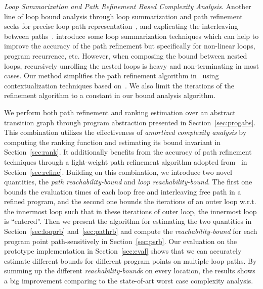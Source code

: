 \emph{Loop Summarization and Path Refinement Based Complexity Analysis}.
Another line of loop bound analysis through loop summarization and path refinement seeks for precise loop path representation~\cite{ManoliosV06,BalakrishnanSIG09,SharmaDDA11,Flores-MontoyaH14,HumenbergerJK18,CyphertBKR19}, and explicating the interleaving between paths~\cite{GulwaniJK09,ZulegerGSV11}.
\cite{KincaidBCR19,KincaidCBR18,BreckCKR20} introduce some loop summarization techniques which can help to improve the accuracy of the path refinement but specifically for non-linear loops, program recurrence, etc.
However, when composing the bound between nested loops, recursively unrolling the nested loops is heavy and non-terminating in most cases.
%
Our method simplifies the path refinement algorithm in~\cite{GulwaniJK09} using contextualization techniques based on~\cite{ZulegerGSV11,SinnZV14,ManoliosV06}.
We also limit the iterations of the refinement algorithm to a constant in our bound analysis algorithm.
%

We perform both path refinement and ranking estimation over an abstract transition graph through program abstraction presented in Section~\ref{sec:progabs}.
This combination utilizes the effectiveness of \emph{amortized complexity analysis} by computing the ranking function
and estimating its bound invariant in Section~\ref{sec:rank}.
It additionally benefits from the accuracy of path refinement techniques through a light-weight path refinement algorithm adopted from~\cite{GulwaniJK09} in Section~\ref{sec:refine}.
Building on this combination, we introduce two novel quantities,
the \emph{path reachability-bound} and \emph{loop reachability-bound}.
The first one bounds the evaluation times of each loop free and interleaving free path in a refined program, and the second one bounds the iterations of an outer loop w.r.t. the innermost loop such that in these iterations of outer loop, the innermost loop is ``entered''. 
Then we present the algorithm for estimating the two quantities in Section~\ref{sec:looprb} and~\ref{sec:pathrb} and compute the \emph{reachability-bound} for each program point path-sensitively in Section~\ref{sec:psrb}.
Our evaluation on the prototype implementation in Section~\ref{sec:eval} shows that we can accurately estimate different bounds for different program points on multiple loop paths. By summing up the different \emph{reachability-bound}s on every location, the results shows a big improvement comparing to the state-of-art worst case complexity analysis.

